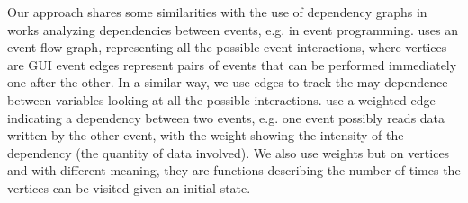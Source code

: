 %
Our approach shares some similarities with the use of dependency graphs in works analyzing dependencies between events, e.g. in event programming. \citet{memon2007event} uses an event-flow graph, representing all the possible event interactions, where vertices are GUI event edges represent pairs of events that can be performed immediately one after the other. In a similar way, we use edges to track the may-dependence between variables looking at all the possible interactions. 
\citet{arlt2012lightweight} use a weighted edge indicating a dependency between two events, e.g. one event possibly reads data written by the other event, with the weight showing the intensity of the dependency (the quantity of data involved). We also use weights but on vertices and with different meaning, they are functions describing the number of times the vertices can be visited given an initial state.
%
%
